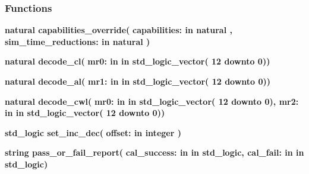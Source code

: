 \subsubsection*{Functions}
 \begin{DoxyCompactItemize}
\item 
{\bfseries {\bfseries \textcolor{comment}{natural}\textcolor{vhdlchar}{ }}} {\bf capabilities\+\_\+override}{\bfseries  ( }{\bfseries \textcolor{vhdlchar}{capabilities\+: }\textcolor{stringliteral}{in }{\bfseries \textcolor{comment}{natural}\textcolor{vhdlchar}{ }}}{\bfseries  , \textcolor{vhdlchar}{sim\+\_\+time\+\_\+reductions\+: }\textcolor{stringliteral}{in }{\bfseries \textcolor{comment}{natural}\textcolor{vhdlchar}{ }}}{\bfseries  )} 
\item 
{\bfseries {\bfseries \textcolor{comment}{natural}\textcolor{vhdlchar}{ }}} {\bf decode\+\_\+cl}{\bfseries  ( }{\bfseries \textcolor{vhdlchar}{mr0\+: }\textcolor{stringliteral}{in }\textcolor{vhdlchar}{in std\+\_\+logic\+\_\+vector( 12 downto  0)}}{\bfseries  )} 
\item 
{\bfseries {\bfseries \textcolor{comment}{natural}\textcolor{vhdlchar}{ }}} {\bf decode\+\_\+al}{\bfseries  ( }{\bfseries \textcolor{vhdlchar}{mr1\+: }\textcolor{stringliteral}{in }\textcolor{vhdlchar}{in std\+\_\+logic\+\_\+vector( 12 downto  0)}}{\bfseries  )} 
\item 
{\bfseries {\bfseries \textcolor{comment}{natural}\textcolor{vhdlchar}{ }}} {\bf decode\+\_\+cwl}{\bfseries  ( }{\bfseries \textcolor{vhdlchar}{mr0\+: }\textcolor{stringliteral}{in }\textcolor{vhdlchar}{in std\+\_\+logic\+\_\+vector( 12 downto  0)}}{\bfseries  , \textcolor{vhdlchar}{mr2\+: }\textcolor{stringliteral}{in }\textcolor{vhdlchar}{in std\+\_\+logic\+\_\+vector( 12 downto  0)}}{\bfseries  )} 
\item 
{\bfseries {\bfseries \textcolor{comment}{std\+\_\+logic}\textcolor{vhdlchar}{ }}} {\bf set\+\_\+inc\+\_\+dec}{\bfseries  ( }{\bfseries \textcolor{vhdlchar}{offset\+: }\textcolor{stringliteral}{in }{\bfseries \textcolor{comment}{integer}\textcolor{vhdlchar}{ }}}{\bfseries  )} 
\item 
{\bfseries {\bfseries \textcolor{comment}{string}\textcolor{vhdlchar}{ }}} {\bf pass\+\_\+or\+\_\+fail\+\_\+report}{\bfseries  ( }{\bfseries \textcolor{vhdlchar}{cal\+\_\+success\+: }\textcolor{stringliteral}{in }\textcolor{vhdlchar}{in std\+\_\+logic}}{\bfseries  , \textcolor{vhdlchar}{cal\+\_\+fail\+: }\textcolor{stringliteral}{in }\textcolor{vhdlchar}{in std\+\_\+logic}}{\bfseries  )} 
\item 

\end{DoxyCompactItemize}

